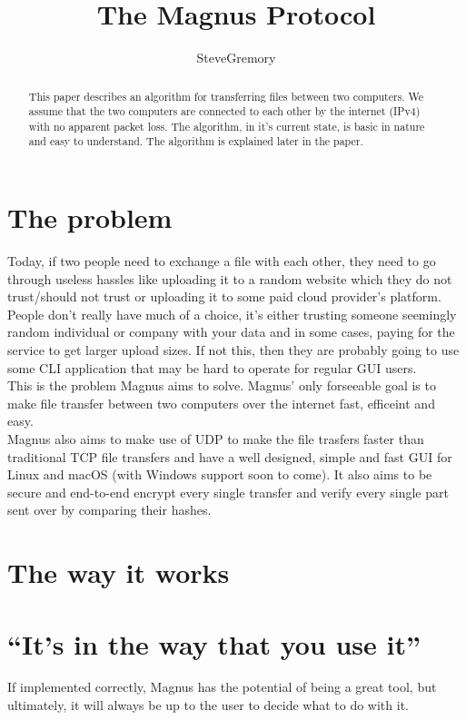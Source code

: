 \documentclass{article}
\title{The Magnus Protocol}
\author{SteveGremory}
\begin{document}
\maketitle

\begin{abstract}
This paper describes an algorithm for transferring files between two computers.
We assume that the two computers are connected to each other by the internet (IPv4)
with no apparent packet loss. The algorithm, in it's current state, is basic in nature
and easy to understand. The algorithm is explained later in the paper.
\end{abstract}

\section{The problem}

Today, if two people need to exchange a file with each other, they
need to go through useless hassles like uploading it to a random website
which they do not trust/should not trust or uploading it to some paid cloud
provider's platform. \\


People don't really have much of a choice, it's either trusting
someone seemingly random individual or company with your data and in some
cases, paying for the service to get larger upload sizes. If not this, then they
are probably going to use some CLI application that may be hard to operate for
regular GUI users. \\


This is the problem Magnus aims to solve. Magnus' only forseeable goal is to make
file transfer between two computers over the internet fast, efficeint and easy. \\


Magnus also aims to make use of UDP to make the file trasfers faster than
traditional TCP file transfers and have a well designed, simple and fast GUI
for Linux and macOS (with Windows support soon to come). It also aims to be
secure and end-to-end encrypt every single transfer and verify every single
part sent over by comparing their hashes. \\

\section{The way it works}

\section{``It's in the way that you use it''}
If implemented correctly, Magnus has the potential of being a great tool, but
ultimately, it will always be up to the user to decide what to do with it. \\
\end{document}
